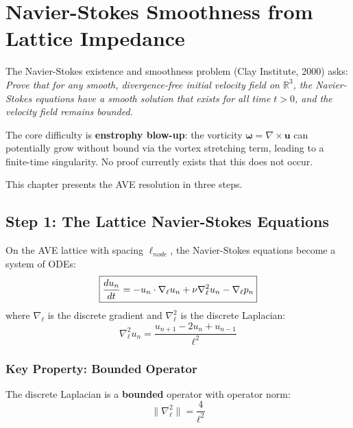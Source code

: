 
\chapter{Navier-Stokes Smoothness from Lattice Impedance}
\label{ch:navier_stokes}

The Navier-Stokes existence and smoothness problem (Clay Institute, 2000)
asks: \textit{Prove that for any smooth, divergence-free initial velocity
field on $\mathbb{R}^3$, the Navier-Stokes equations have a smooth
solution that exists for all time $t > 0$, and the velocity field
remains bounded.}

The core difficulty is \textbf{enstrophy blow-up}: the vorticity
$\boldsymbol{\omega} = \nabla \times \mathbf{u}$ can potentially grow
without bound via the vortex stretching term, leading to a
finite-time singularity.  No proof currently exists that this
does not occur.

This chapter presents the AVE resolution in three steps.

\section{Step 1: The Lattice Navier-Stokes Equations}
\label{sec:ns_lattice}

On the AVE lattice with spacing $\ell_{node}$, the Navier-Stokes
equations become a system of ODEs:
\begin{equation}
    \boxed{%
    \frac{du_n}{dt} = -u_n \cdot \nabla_{\ell} u_n
    + \nu \nabla^2_{\ell} u_n - \nabla_{\ell} p_n
    }
    \label{eq:lattice_ns}
\end{equation}
where $\nabla_{\ell}$ is the discrete gradient and
$\nabla^2_{\ell}$ is the discrete Laplacian:
\begin{equation}
    \nabla^2_{\ell} u_n
    = \frac{u_{n+1} - 2u_n + u_{n-1}}{\ell^2}
    \label{eq:discrete_laplacian}
\end{equation}

\subsection{Key Property: Bounded Operator}

The discrete Laplacian is a \textbf{bounded} operator with operator
norm:
\begin{equation}
    \| \nabla^2_{\ell} \| = \frac{4}{\ell^2}
    \label{eq:laplacian_norm}
\end{equation}

